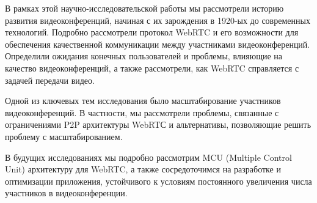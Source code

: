 
В рамках этой научно-исследовательской работы мы рассмотрели историю развития видеоконференций, начиная с их зарождения в 1920-ых до современных технологий. Подробно рассмотрели протокол WebRTC и его возможности для обеспечения качественной коммуникации между участниками видеоконференций. Определили ожидания конечных пользователей и проблемы, влияющие на качество видеоконференций, а также рассмотрели, как WebRTC справляется с задачей передачи видео.

Одной из ключевых тем исследования было масштабирование участников видеоконференций. В частности, мы рассмотрели проблемы, связанные с ограничениями P2P архитектуры WebRTС и альтернативы, позволяющие решить проблему с масштабированием.

В будущих исследованиях мы подробно рассмотрим MCU (Multiple Control Unit) архитектуру для WebRTC, а также сосредоточимся на разработке и оптимизации приложения, устойчивого к условиям постоянного увеличения числа участников в видеоконференции.

\pagebreak